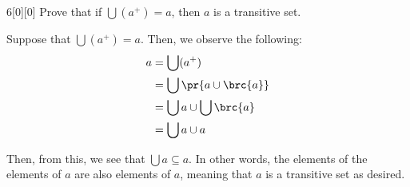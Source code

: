 \documentclass{article}
\begin{document}
\begin{hw}{6}[0][0]
	Prove that if $\bigcup (a^{+}) = a$, then $a$ is a transitive set.
\end{hw}
\begin{solution}
	Suppose that $\bigcup (a^{+}) = a$. Then, we observe the following:
	\begin{align*}
		a &= \bigcup (a^{+}) \\
		&= \bigcup \pr{a \cup \brc{a}} \\
		&= \bigcup a \cup \bigcup \brc{a} \\
		&= \bigcup a \cup a
	\end{align*}

	Then, from this, we see that $\bigcup a \subseteq a$. In other words, the elements of the elements of $a$ are also elements of $a$, meaning that $a$ is a transitive set as desired.
\end{solution}
\end{document}
